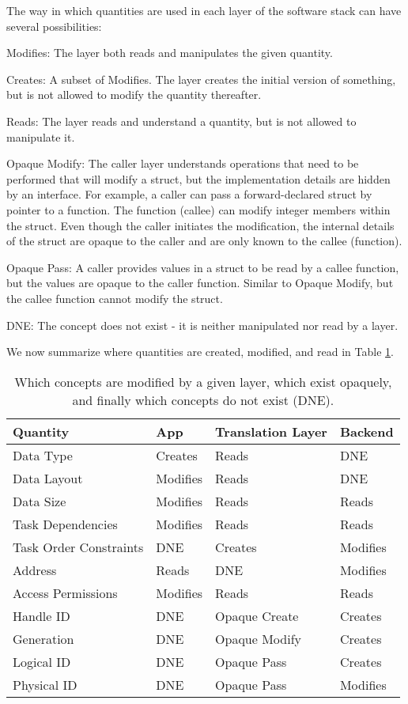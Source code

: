 The way in which quantities are used in each layer of the software stack can have several possibilities:
\begin{compactitem}
\item Modifies: The layer both reads and manipulates the given quantity.
\item Creates: A subset of Modifies. The layer creates the initial version of something, but is not allowed to modify the quantity thereafter.
\item Reads: The layer reads and understand a quantity, but is not allowed to manipulate it.
\item Opaque Modify: The caller layer understands operations that need to be performed that will modify a struct, but the implementation details are hidden by an interface. 
For example, a caller can pass a forward-declared struct by pointer to a function. 
The function (callee) can modify integer members within the struct. 
Even though the caller initiates the modification, the internal details of the struct are opaque to the caller and are only known to the callee (function).
\item Opaque Pass: A caller provides values in a struct to be read by a callee function, but the values are opaque to the caller function. 
Similar to Opaque Modify, but the callee function cannot modify the struct.
\item DNE: The concept does not exist - it is neither manipulated nor read by a layer.
\end{compactitem}
We now summarize where quantities are created, modified, and read in Table \ref{tbl:conceptsInLayers}.

\begin{table}
  \centering
\begin{tabular}{l l l l}
\hline
Quantity & App & Translation Layer & Backend \\
\hline
Data Type & Creates & Reads & DNE \\
Data Layout & Modifies & Reads & DNE \\
Data Size & Modifies & Reads & Reads \\
Task Dependencies & Modifies & Reads & Reads \\
Task Order Constraints & DNE & Creates & Modifies \\
Address & Reads & DNE & Modifies \\
Access Permissions & Modifies & Reads & Reads \\
Handle ID & DNE & Opaque Create & Creates \\
Generation & DNE & Opaque Modify & Creates \\
Logical ID & DNE & Opaque Pass & Creates \\
Physical ID & DNE & Opaque Pass & Modifies 
\end{tabular}
\caption{Which concepts are modified by a given layer, which exist opaquely, and finally which concepts do not exist (DNE).}
\label{tbl:conceptsInLayers}
\end{table}

